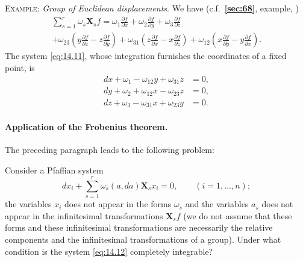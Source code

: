 \documentclass[leqno,11pt]{book}
\numberwithin{equation}{chapter}
\newcommand{\pd}{\partial}
\theoremstyle{shape1}
\theoremstyle{shapesmall}
\newcommand{\fsref}[1]{{\rm\textsection\textbf{\ref{sec:#1}}}}
\newcommand{\somespace}{\vspace{9pt}}
\begin{document}
{\small
\textsc{Example}: \emph{Group of Euclidean displacements}. We have (c.f.~\fsref{68}, example, \pageref{sec:68})
\begin{multline*}
  \sum_{s=1}^{r}\omega_{s}\mathbf{X}_{s}f=
  \omega_{1}\frac{\pd f}{\pd x}+
  \omega_{2}\frac{\pd f}{\pd y}+
  \omega_{3}\frac{\pd f}{\pd z}\\
  +\omega_{23}\left(y\frac{\pd f}{\pd z}-z\frac{\pd f}{\pd y}\right)
  +\omega_{31}\left(z\frac{\pd f}{\pd x}-x\frac{\pd f}{\pd z}\right)
  +\omega_{12}\left(x\frac{\pd f}{\pd y}-y\frac{\pd f}{\pd x}\right).
\end{multline*}
The system \eqref{eq:14.11}, whose integration furnishes the coordinates of a fixed point, is
\begin{align*}
  dx+\omega_{1}-\omega_{12}y+\omega_{31}z&=0,\\
  dy+\omega_{2}+\omega_{12}x-\omega_{23}z&=0,\\
  dz+\omega_{3}-\omega_{31}x+\omega_{23}y&=0.
\end{align*}
}


\paragraph{Application of the Frobenius theorem.}
\label{sec:209}
The preceding paragraph leads to the following problem:

\somespace

Consider a Pfaffian system
\begin{equation}
  \label{eq:14.12}
  dx_{i}+\sum_{s=1}^{r}\omega_{s}(a,da)\mathbf{X}_{s}x_{i}=0,\qquad(i=1,\dots,n);  
\end{equation}
the variables $x_{i}$ does not appear in the forms $\omega_{s}$ and the variables $a_{s}$ does not appear in the infinitesimal transformations $\mathbf{X}_{s}f$ (we do not assume that these forms and these infinitesimal transformations are necessarily the relative components and the infinitesimal transformations of a group). Under what condition is the system \eqref{eq:14.12} completely integrable?

\somespace
\end{document}

